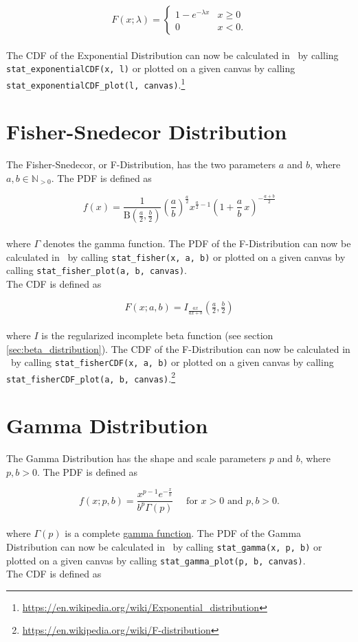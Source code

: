 		$$F(x;\lambda) = \begin{cases} 1-e^{-\lambda x} & x \ge 0 \\ 0 & x < 0. \end{cases}$$
		\\[0.3cm]
		The \ac{CDF} of the Exponential Distribution can now be calculated in \setlx\ by calling \lstinline{stat_exponentialCDF(x, l)} or plotted on a given canvas by calling \lstinline{stat_exponentialCDF_plot(l, canvas)}.\footnote{\url{https://en.wikipedia.org/wiki/Exponential_distribution}}


	\section{Fisher-Snedecor Distribution} 

		The Fisher-Snedecor, or F-Distribution, has the two parameters $a$ and $b$, where $a,b \in \mathbb{N}_{>0}$. The \ac{PDF} is defined as

		$$
			f(x) = \frac{1}{\mathrm{B}\!\left(\frac{a}{2},\frac{b}{2}\right)} \left(\frac{a}{b}\right)^{\frac{a}{2}} x^{\frac{a}{2} - 1} \left(1+\frac{a}{b}\,x\right)^{-\frac{a+b}{2}}
		$$
		\\[0.3cm]
		where $\Gamma$ denotes the gamma function. The \ac{PDF} of the F-Distribution can now be calculated in \setlx\ by calling \lstinline{stat_fisher(x, a, b)} or plotted on a given canvas by calling \lstinline{stat_fisher_plot(a, b, canvas)}.
		\\[0.3cm]
		The \ac{CDF} is defined as

		$$F(x; a,b)=I_{\frac{a x}{a x + b}}\left (\tfrac{a}{2}, \tfrac{b}{2} \right)$$
		\\[0.3cm]
		where $I$ is the regularized incomplete beta function (see section \ref{sec:beta_distribution}). The \ac{CDF} of the F-Distribution can now be calculated in \setlx\ by calling \lstinline{stat_fisherCDF(x, a, b)} or plotted on a given canvas by calling \lstinline{stat_fisherCDF_plot(a, b, canvas)}.\footnote{\url{https://en.wikipedia.org/wiki/F-distribution}}


	\section{Gamma Distribution}

		The Gamma Distribution has the shape and scale parameters $p$ and $b$, where $p,b > 0$. The \ac{PDF} is defined as

		$$f(x;p,b) =  \frac{x^{p-1}e^{-\frac{x}{b}}}{b^p\Gamma(p)} \quad \text{ for } x > 0 \text{ and } p, b > 0.$$
		\\[0.3cm]
		where $\Gamma(p)$ is a complete \href{https://en.wikipedia.org/wiki/Gamma_function}{gamma function}. The \ac{PDF} of the Gamma Distribution can now be calculated in \setlx\ by calling \lstinline{stat_gamma(x, p, b)} or plotted on a given canvas by calling \lstinline{stat_gamma_plot(p, b, canvas)}.
		\\[0.3cm]
		The \ac{CDF} is defined as


